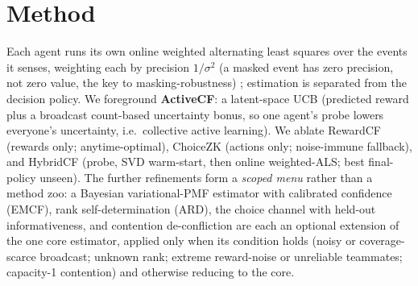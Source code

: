 \documentclass[11pt]{article}
\theoremstyle{plain}
\begin{document}
\section{Method}
Each agent runs its own online weighted alternating least squares over the events it
senses, weighting each by precision $1/\sigma^2$ (a masked event has zero precision,
not zero value, the key to masking-robustness) \cite{hu2008collaborative}; estimation
is separated from the decision policy. We foreground \textbf{ActiveCF}: a
latent-space UCB (predicted reward plus a broadcast count-based uncertainty bonus, so
one agent's probe lowers everyone's uncertainty, i.e.\ collective active learning). We
ablate RewardCF (rewards only; anytime-optimal), ChoiceZK (actions only; noise-immune
fallback), and HybridCF (probe, SVD warm-start, then online weighted-ALS; best
final-policy unseen). The further refinements form a \emph{scoped menu} rather than a
method zoo: a Bayesian variational-PMF estimator with calibrated confidence (EMCF), rank
self-determination (ARD), the choice channel with held-out informativeness, and contention
de-confliction are each an optional extension of the one core estimator, applied only when
its condition holds (noisy or coverage-scarce broadcast; unknown rank; extreme reward-noise
or unreliable teammates; capacity-1 contention) and otherwise reducing to the core.
\end{document}
